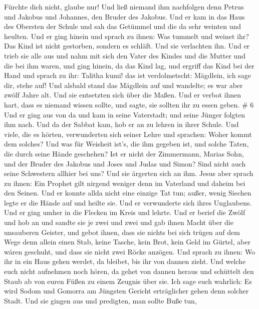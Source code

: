 Fürchte dich nicht, glaube nur!  Und ließ niemand ihm
nachfolgen denn Petrus und Jakobus und Johannes, den Bruder des Jakobus.
 Und er kam in das Haus des Obersten der Schule und sah das
Getümmel und die da sehr weinten und heulten.  Und er ging
hinein und sprach zu ihnen: Was tummelt und weinet ihr? Das Kind ist
nicht gestorben, sondern es schläft. Und sie verlachten ihn.
 Und er trieb sie alle aus und nahm mit sich den Vater des
Kindes und die Mutter und die bei ihm waren, und ging hinein, da das
Kind lag,  und ergriff das Kind bei der Hand und sprach zu
ihr: Talitha kumi! das ist verdolmetscht: Mägdlein, ich sage dir, stehe
auf!  Und alsbald stand das Mägdlein auf und wandelte; es
war aber zwölf Jahre alt. Und sie entsetzten sich über die Maßen.
 Und er verbot ihnen hart, dass es niemand wissen sollte,
und sagte, sie sollten ihr zu essen geben. \# 6  Und er ging
aus von da und kam in seine Vaterstadt; und seine Jünger folgten ihm
nach.  Und da der Sabbat kam, hob er an zu lehren in ihrer
Schule. Und viele, die es hörten, verwunderten sich seiner Lehre und
sprachen: Woher kommt dem solches? Und was für Weisheit ist's, die ihm
gegeben ist, und solche Taten, die durch seine Hände geschehen?
 Ist er nicht der Zimmermann, Marias Sohn, und der Bruder
des Jakobus und Joses und Judas und Simon? Sind nicht auch seine
Schwestern allhier bei uns? Und sie ärgerten sich an ihm. 
Jesus aber sprach zu ihnen: Ein Prophet gilt nirgend weniger denn im
Vaterland und daheim bei den Seinen.  Und er konnte allda
nicht eine einzige Tat tun; außer, wenig Siechen legte er die Hände auf
und heilte sie.  Und er verwunderte sich ihres Unglaubens.
Und er ging umher in die Flecken im Kreis und lehrte.  Und
er berief die Zwölf und hob an und sandte sie je zwei und zwei und gab
ihnen Macht über die unsauberen Geister,  und gebot ihnen,
dass sie nichts bei sich trügen auf dem Wege denn allein einen Stab,
keine Tasche, kein Brot, kein Geld im Gürtel,  aber wären
geschuht, und dass sie nicht zwei Röcke anzögen.  Und
sprach zu ihnen: Wo ihr in ein Haus gehen werdet, da bleibet, bis ihr
von dannen zieht.  Und welche euch nicht aufnehmen noch
hören, da gehet von dannen heraus und schüttelt den Staub ab von euren
Füßen zu einem Zeugnis über sie. Ich sage euch wahrlich: Es wird Sodom
und Gomorra am Jüngsten Gericht erträglicher gehen denn solcher Stadt.
 Und sie gingen aus und predigten, man sollte Buße tun,
